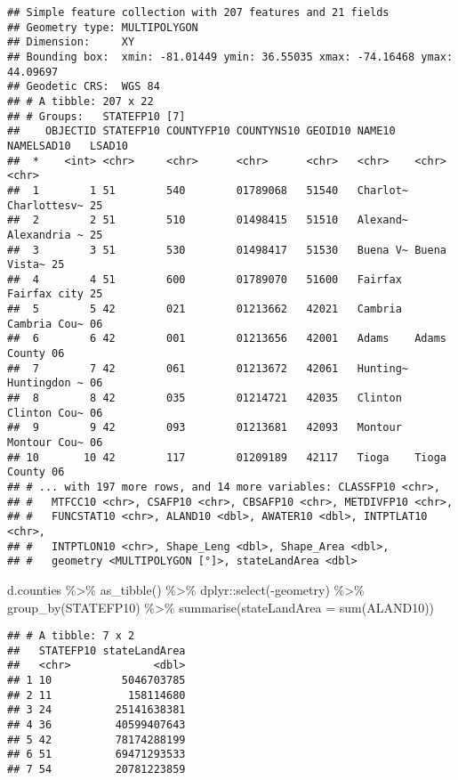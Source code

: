 \documentclass[
]{article}
\newenvironment{Shaded}{\begin{snugshade}}{\end{snugshade}}
\newcommand{\AttributeTok}[1]{\textcolor[rgb]{0.77,0.63,0.00}{#1}}
\newcommand{\FunctionTok}[1]{\textcolor[rgb]{0.00,0.00,0.00}{#1}}
\newcommand{\NormalTok}[1]{#1}
\newcommand{\SpecialCharTok}[1]{\textcolor[rgb]{0.00,0.00,0.00}{#1}}
\begin{document}
\begin{verbatim}
## Simple feature collection with 207 features and 21 fields
## Geometry type: MULTIPOLYGON
## Dimension:     XY
## Bounding box:  xmin: -81.01449 ymin: 36.55035 xmax: -74.16468 ymax: 44.09697
## Geodetic CRS:  WGS 84
## # A tibble: 207 x 22
## # Groups:   STATEFP10 [7]
##    OBJECTID STATEFP10 COUNTYFP10 COUNTYNS10 GEOID10 NAME10   NAMELSAD10   LSAD10
##  *    <int> <chr>     <chr>      <chr>      <chr>   <chr>    <chr>        <chr> 
##  1        1 51        540        01789068   51540   Charlot~ Charlottesv~ 25    
##  2        2 51        510        01498415   51510   Alexand~ Alexandria ~ 25    
##  3        3 51        530        01498417   51530   Buena V~ Buena Vista~ 25    
##  4        4 51        600        01789070   51600   Fairfax  Fairfax city 25    
##  5        5 42        021        01213662   42021   Cambria  Cambria Cou~ 06    
##  6        6 42        001        01213656   42001   Adams    Adams County 06    
##  7        7 42        061        01213672   42061   Hunting~ Huntingdon ~ 06    
##  8        8 42        035        01214721   42035   Clinton  Clinton Cou~ 06    
##  9        9 42        093        01213681   42093   Montour  Montour Cou~ 06    
## 10       10 42        117        01209189   42117   Tioga    Tioga County 06    
## # ... with 197 more rows, and 14 more variables: CLASSFP10 <chr>,
## #   MTFCC10 <chr>, CSAFP10 <chr>, CBSAFP10 <chr>, METDIVFP10 <chr>,
## #   FUNCSTAT10 <chr>, ALAND10 <dbl>, AWATER10 <dbl>, INTPTLAT10 <chr>,
## #   INTPTLON10 <chr>, Shape_Leng <dbl>, Shape_Area <dbl>,
## #   geometry <MULTIPOLYGON [°]>, stateLandArea <dbl>
\end{verbatim}

\begin{Shaded}
\begin{Highlighting}[]
\NormalTok{d.counties }\SpecialCharTok{\%\textgreater{}\%} \FunctionTok{as\_tibble}\NormalTok{() }\SpecialCharTok{\%\textgreater{}\%}\NormalTok{ dplyr}\SpecialCharTok{::}\FunctionTok{select}\NormalTok{(}\SpecialCharTok{{-}}\NormalTok{geometry) }\SpecialCharTok{\%\textgreater{}\%} 
  \FunctionTok{group\_by}\NormalTok{(STATEFP10) }\SpecialCharTok{\%\textgreater{}\%} 
  \FunctionTok{summarise}\NormalTok{(}\AttributeTok{stateLandArea =} \FunctionTok{sum}\NormalTok{(ALAND10))}
\end{Highlighting}
\end{Shaded}

\begin{verbatim}
## # A tibble: 7 x 2
##   STATEFP10 stateLandArea
##   <chr>             <dbl>
## 1 10           5046703785
## 2 11            158114680
## 3 24          25141638381
## 4 36          40599407643
## 5 42          78174288199
## 6 51          69471293533
## 7 54          20781223859
\end{verbatim}
\end{document}
